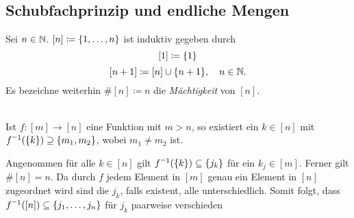 \documentclass[../ana1.tex]{subfiles}
\begin{document}
\subsection{Schubfachprinzip und endliche Mengen}

\begin{notation}
	Sei \(n \in \mathbb{N} \). \([n] \coloneqq \{1 , \ldots , n\} \) ist induktiv gegeben durch
	\[[1] \coloneqq \{1\} \]
	\[[n + 1] \coloneqq [n] \cup \{n + 1\} , \quad n \in \mathbb{N}.\]
	Es bezeichne weiterhin \(\#[n] \coloneqq n \) die \textit{Mächtigkeit} von \([n] \).
\end{notation}

\begin{satz*}[Schubfachprinzip]\label{satz:schubfach}\leavevmode \\
	Ist \(f \colon [m] \longrightarrow [n] \) eine Funktion mit \(m > n \), so existiert ein \(k \in [n]\) mit 
	\(\inverse{f}(\set{k}) \supseteq \set{m_1 \ko m_2} \), wobei \(m_1 \neq m_2 \) ist.
\end{satz*}
\begin{bew}
	Angenommen für alle \(k \in [n] \) gilt \(\inverse{f}(\set{k}) \subseteq \set{j_k} \) für ein \(k_j \in [m] \).
	Ferner gilt \(\#[n] = n \). Da durch \(f \) jedem Element in \([m] \) genau ein Element in \([n] \) zugeordnet wird
	sind die \(j_k \), falls existent, alle unterschiedlich.
	Somit folgt, dass \(\inverse{f}([n]) \subseteq \set{j_1 \ko \ldots \ko j_n} \) für \(j_k \) paarweise verschieden 
\end{bew}
\end{document}
